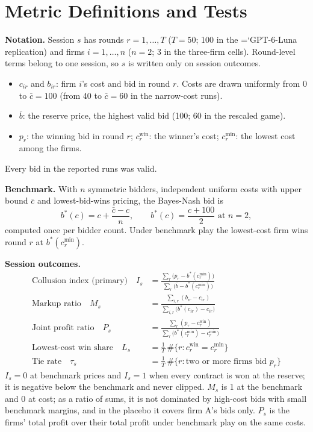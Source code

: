 \documentclass[10pt]{article}
\newcommand{\model}[1]{{\ttfamily\hyphenchar\font=`\-\relax #1}}
\newcommand{\LU}{\model{GPT-6-Luna}}
\newcommand{\para}[1]{\textbf{#1}\hspace{0.4em}}
\begin{document}
\section{Metric Definitions and Tests}
\label{app:metrics}

\para{Notation.} Session $s$ has rounds $r = 1, \dots, T$ ($T = 50$; 100 in the \LU{} replication) and firms $i = 1, \dots, n$ ($n = 2$; 3 in the three-firm cells). Round-level terms belong to one session, so $s$ is written only on session outcomes.
\begin{itemize}[leftmargin=1.5em,itemsep=0pt,topsep=2pt]
\item $c_{ir}$ and $b_{ir}$: firm $i$'s cost and bid in round $r$. Costs are drawn uniformly from 0 to $\bar c = 100$ (from 40 to $\bar c = 60$ in the narrow-cost runs).
\item $\bar b$: the reserve price, the highest valid bid (100; 60 in the rescaled game).
\item $p_r$: the winning bid in round $r$; $c^{\text{win}}_r$: the winner's cost; $c^{\min}_r$: the lowest cost among the firms.
\end{itemize}
Every bid in the reported runs was valid.

\para{Benchmark.} With $n$ symmetric bidders, independent uniform costs with upper bound $\bar c$ and lowest-bid-wins pricing, the Bayes-Nash bid is
\[
b^*(c) = c + \frac{\bar c - c}{n}, \qquad b^*(c) = \frac{c + 100}{2} \text{ at } n = 2,
\]
computed once per bidder count. Under benchmark play the lowest-cost firm wins round $r$ at $b^*(c^{\min}_r)$.

\para{Session outcomes.}
\begin{align*}
\text{Collusion index (primary)}\quad I_s &= \frac{\sum_r \big(p_r - b^*(c^{\min}_r)\big)}{\sum_r \big(\bar b - b^*(c^{\min}_r)\big)} \\[4pt]
\text{Markup ratio}\quad M_s &= \frac{\sum_{i,r} (b_{ir} - c_{ir})}{\sum_{i,r} \big(b^*(c_{ir}) - c_{ir}\big)} \\[4pt]
\text{Joint profit ratio}\quad P_s &= \frac{\sum_r (p_r - c^{\text{win}}_r)}{\sum_r \big(b^*(c^{\min}_r) - c^{\min}_r\big)} \\[4pt]
\text{Lowest-cost win share}\quad L_s &= \tfrac{1}{T}\,\#\{r : c^{\text{win}}_r = c^{\min}_r\} \\[2pt]
\text{Tie rate}\quad \tau_s &= \tfrac{1}{T}\,\#\{r : \text{two or more firms bid } p_r\}
\end{align*}
$I_s = 0$ at benchmark prices and $I_s = 1$ when every contract is won at the reserve; it is negative below the benchmark and never clipped. $M_s$ is 1 at the benchmark and 0 at cost; as a ratio of sums, it is not dominated by high-cost bids with small benchmark margins, and in the placebo it covers firm A's bids only. $P_s$ is the firms' total profit over their total profit under benchmark play on the same costs.
\end{document}
